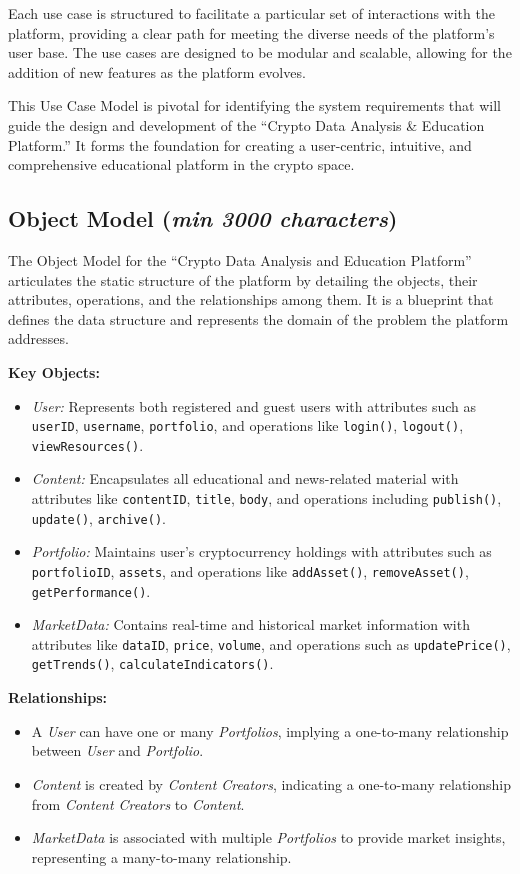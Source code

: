 \documentclass[12pt]{report}
\newcommand{\characters}[1]{(\textit{min #1 characters})}
\begin{document}
Each use case is structured to facilitate a particular set of interactions with the platform, providing a clear path for meeting the diverse needs of the platform's user base. The use cases are designed to be modular and scalable, allowing for the addition of new features as the platform evolves.

This Use Case Model is pivotal for identifying the system requirements that will guide the design and development of the ``Crypto Data Analysis \& Education Platform.'' It forms the foundation for creating a user-centric, intuitive, and comprehensive educational platform in the crypto space.


\subsection{Object Model \characters{3000}}
The Object Model for the ``Crypto Data Analysis and Education Platform'' articulates the static structure of the platform by detailing the objects, their attributes, operations, and the relationships among them. It is a blueprint that defines the data structure and represents the domain of the problem the platform addresses.

\textbf{Key Objects:}
\begin{itemize}
    \item \textit{User:} Represents both registered and guest users with attributes such as \texttt{userID}, \texttt{username}, \texttt{portfolio}, and operations like \texttt{login()}, \texttt{logout()}, \texttt{viewResources()}.
    \item \textit{Content:} Encapsulates all educational and news-related material with attributes like \texttt{contentID}, \texttt{title}, \texttt{body}, and operations including \texttt{publish()}, \texttt{update()}, \texttt{archive()}.
    \item \textit{Portfolio:} Maintains user's cryptocurrency holdings with attributes such as \texttt{portfolioID}, \texttt{assets}, and operations like \texttt{addAsset()}, \texttt{removeAsset()}, \texttt{getPerformance()}.
    \item \textit{MarketData:} Contains real-time and historical market information with attributes like \texttt{dataID}, \texttt{price}, \texttt{volume}, and operations such as \texttt{updatePrice()}, \texttt{getTrends()}, \texttt{calculateIndicators()}.
\end{itemize}

\textbf{Relationships:}
\begin{itemize}
    \item A \textit{User} can have one or many \textit{Portfolios}, implying a one-to-many relationship between \textit{User} and \textit{Portfolio}.
    \item \textit{Content} is created by \textit{Content Creators}, indicating a one-to-many relationship from \textit{Content Creators} to \textit{Content}.
    \item \textit{MarketData} is associated with multiple \textit{Portfolios} to provide market insights, representing a many-to-many relationship.
\end{itemize}
\end{document}

